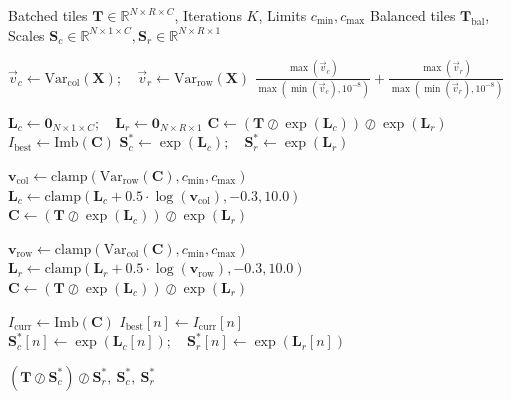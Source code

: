 \documentclass{llmxive}
\begin{document}
\begin{algorithm}[t]
\small
\caption{VarN, Variance-Normalization by Alternating Log-Domain Dual-Scale Balancing}
\label{alg:sinq}
\begin{algorithmic}[1]
\Require Batched tiles $\mathbf{T} \in \mathbb{R}^{N \times R \times C}$, Iterations $K$, Limits $c_\text{min}, c_\text{max}$
\Ensure Balanced tiles $\mathbf{T}_{\text{bal}}$, Scales $\mathbf{S}_c \in \mathbb{R}^{N \times 1 \times C}, \mathbf{S}_r \in \mathbb{R}^{N \times R \times 1}$

    \State $\vec{v}_c \gets \text{Var}_{\text{col}}(\mathbf{X}); \quad \vec{v}_r \gets \text{Var}_{\text{row}}(\mathbf{X})$ 
    \State \Return $\frac{\max(\vec{v}_c)}{\max(\min(\vec{v}_c), 10^{-8})} + \frac{\max(\vec{v}_r)}{\max(\min(\vec{v}_r), 10^{-8})}$
\EndFunction
\vspace{0.1cm}

\State $\mathbf{L}_c \gets \mathbf{0}_{N \times 1 \times C} ; \quad \mathbf{L}_r \gets \mathbf{0}_{N \times R \times 1}$ 
\State $\mathbf{C} \gets (\mathbf{T} \oslash \exp(\mathbf{L}_c)) \oslash \exp(\mathbf{L}_r)$ 
\State $I_{\text{best}} \gets \text{Imb}(\mathbf{C})$
\State $\mathbf{S}_c^* \gets \exp(\mathbf{L}_c) ; \quad \mathbf{S}_r^* \gets \exp(\mathbf{L}_r)$ 

    \State $\mathbf{v}_{\text{col}} \gets \text{clamp}(\text{Var}_\text{row}(\mathbf{C}), c_\text{min}, c_\text{max})$
    \State $\mathbf{L}_c \gets \text{clamp}(\mathbf{L}_c + 0.5 \cdot \log(\mathbf{v}_{\text{col}}), -0.3, 10.0)$
    \State $\mathbf{C} \gets (\mathbf{T} \oslash \exp(\mathbf{L}_c)) \oslash \exp(\mathbf{L}_r)$
    
    \State $\mathbf{v}_{\text{row}} \gets \text{clamp}(\text{Var}_\text{col}(\mathbf{C}), c_\text{min}, c_\text{max})$
    \State $\mathbf{L}_r \gets \text{clamp}(\mathbf{L}_r + 0.5 \cdot \log(\mathbf{v}_{\text{row}}), -0.3, 10.0)$
    \State $\mathbf{C} \gets (\mathbf{T} \oslash \exp(\mathbf{L}_c)) \oslash \exp(\mathbf{L}_r)$
    
    \State $I_{\text{curr}} \gets \text{Imb}(\mathbf{C})$
     
            \State $I_{\text{best}}[n] \gets I_{\text{curr}}[n]$
            \State $\mathbf{S}_c^*[n] \gets \exp(\mathbf{L}_c[n]) ; \quad \mathbf{S}_r^*[n] \gets \exp(\mathbf{L}_r[n])$
        \EndIf
    \EndFor
\EndFor

\State \Return $(\mathbf{T} \oslash \mathbf{S}_c^*) \oslash \mathbf{S}_r^*, ~ \mathbf{S}_c^*, ~ \mathbf{S}_r^*$ 
\end{algorithmic}
\end{algorithm}
\end{document}
